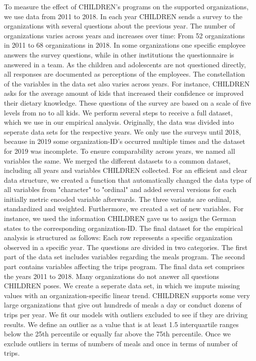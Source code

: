 \documentclass[12pt, a4paper, titlepage]{article}\usepackage[]{graphicx}\usepackage[]{color}
\begin{document}
To measure the effect of CHILDREN's programs on the supported organizations, we use data from 2011 to 2018. In each year CHILDREN sends a survey to the organizations with several questions about the previous year. The number of organizations varies across years and increases over time: From 52 organizations in 2011 to 68 organizations in 2018. In some organizations one specific employee answers the survey questions, while in other institutions the questionnaire is answered in a team. As the children and adolescents are not questioned directly, all responses are documented as perceptions of the employees. The constellation of the variables in the data set also varies across years. For instance, CHILDREN asks for the average amount of kids that increased their confidence or improved their dietary knowledge. These questions of the survey are based on a scale of five levels from no to all kids. We perform several steps to receive a full dataset, which we use in our empirical analysis. Originally, the data was divided into seperate data sets for the respective years. We only use the surveys until 2018, because in 2019 some organization-ID's occurred multiple times and the dataset for 2019 was incomplete. To ensure comparability across years, we named all variables the same. We merged the different datasets to a common dataset, including all years and variables CHILDREN collected. For an efficient and clear data structure, we created a function that automatically changed the data type of all variables from "character" to "ordinal" and added several versions for each initially metric encoded variable afterwards. The three variants are ordinal, standardized and weighted.
Furthermore, we created a set of new variables. For instance, we used the information CHILDREN gave us to assign the German states to the corresponding organization-ID. 
The final dataset for the empirical analysis is structured as follows: Each row represents a specific organization observed in a specific year. The questions are divided in two categories. The first part of the data set includes variables regarding the meals program. The second part contains variables affecting the trips program. The final data set comprises the years 2011 to 2018.
Many organizations do not answer all questions CHILDREN poses. We create a seperate data set, in which we impute missing values with an organization-specific linear trend. CHILDREN supports some very large organizations that give out hundreds of meals a day or conduct dozens of trips per year. We fit our models with outliers excluded to see if they are driving results. We define an outlier as a value that is at least 1.5 interquartile ranges below the 25th percentile or equally far above the 75th percentile. Once we exclude outliers in terms of numbers of meals and once in terms of number of trips.
\end{document}
